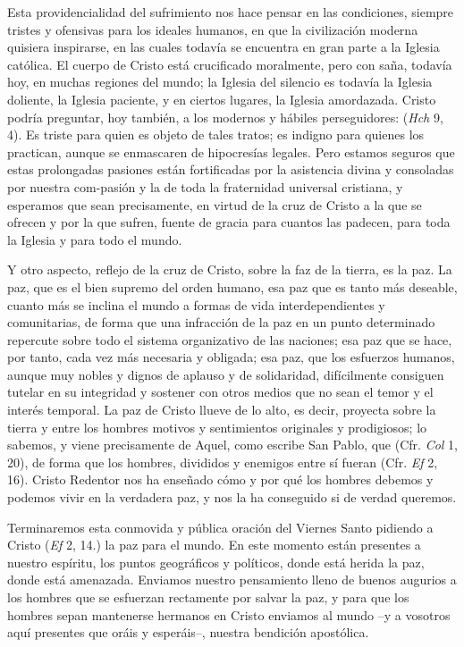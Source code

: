\begin{body}
Esta providencialidad del sufrimiento nos hace pensar en las condiciones, siempre tristes y ofensivas para los ideales humanos, en que la civilización moderna quisiera inspirarse, en las cuales todavía se encuentra en gran parte a la Iglesia católica. El cuerpo de Cristo está crucificado moralmente, pero con saña, todavía hoy, en muchas regiones del mundo; la Iglesia del silencio es todavía la Iglesia doliente, la Iglesia paciente, y en ciertos lugares, la Iglesia amordazada. Cristo podría preguntar, hoy también, a los modernos y hábiles perseguidores:  (\textit{Hch} 9, 4). Es triste para quien es objeto de tales tratos; es indigno para quienes los practican, aunque se enmascaren de hipocresías legales. Pero estamos seguros que estas prolongadas pasiones están fortificadas por la asistencia divina y consoladas por nuestra com-pasión y la de toda la fraternidad universal cristiana, y esperamos que sean precisamente, en virtud de la cruz de Cristo a la que se ofrecen y por la que sufren, fuente de gracia para cuantos las padecen, para toda la Iglesia y para todo el mundo.

Y otro aspecto, reflejo de la cruz de Cristo, sobre la faz de la tierra, es la paz. La paz, que es el bien supremo del orden humano, esa paz que es tanto más deseable, cuanto más se inclina el mundo a formas de vida interdependientes y comunitarias, de forma que una infracción de la paz en un punto determinado repercute sobre todo el sistema organizativo de las naciones; esa paz que se hace, por tanto, cada vez más necesaria y obligada; esa paz, que los esfuerzos humanos, aunque muy nobles y dignos de aplauso y de solidaridad, difícilmente consiguen tutelar en su integridad y sostener con otros medios que no sean el temor y el interés temporal. La paz de Cristo llueve de lo alto, es decir, proyecta sobre la tierra y entre los hombres motivos y sentimientos originales y prodigiosos; lo sabemos, y viene precisamente de Aquel, como escribe San Pablo, que  (Cfr. \textit{Col} 1, 20), de forma que los hombres, divididos y enemigos entre sí fueran  (Cfr. \textit{Ef} 2, 16). Cristo Redentor nos ha enseñado cómo y por qué los hombres debemos y podemos vivir en la verdadera paz, y nos la ha conseguido si de verdad queremos.

Terminaremos esta conmovida y pública oración del Viernes Santo pidiendo a Cristo  (\textit{Ef} 2, 14.) la paz para el mundo. En este momento están presentes a nuestro espíritu, los puntos geográficos y políticos, donde está herida la paz, donde está amenazada. Enviamos nuestro pensamiento lleno de buenos augurios a los hombres que se esfuerzan rectamente por salvar la paz, y para que los hombres sepan mantenerse hermanos en Cristo enviamos al mundo –y a vosotros aquí presentes que oráis y esperáis–, nuestra bendición apostólica.
\end{body}

